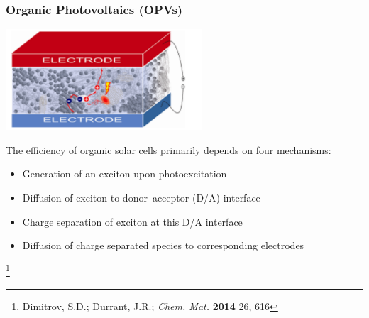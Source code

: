 \documentclass[usepdftitle=false,10pt]{beamer}
\newcommand\blfootnote[1]{%
  \begingroup
  \renewcommand\thefootnote{}\footnote{#1}%
  \addtocounter{footnote}{-1}%
  \endgroup
}
\begin{document}
%
\begin{frame}
  \frametitle{\textbf{O}rganic \textbf{P}hoto\textbf{v}oltaics (OPVs)}
  \begin{center}
    \includegraphics[width=0.55\textwidth]{OPV}
  \end{center}
  The efficiency of organic solar cells primarily depends on four
  mechanisms:
  \begin{itemize}
    \item[\ding{228}] Generation of an exciton upon photoexcitation
    \item[\ding{228}] Diffusion of exciton to donor--acceptor (D/A) interface
    \item[\ding{228}] Charge separation of exciton at this D/A interface
    \item[\ding{228}] Diffusion of charge separated species to corresponding electrodes
  \end{itemize}
  \blfootnote{\tiny Dimitrov, S.D.; Durrant, J.R.; \emph{Chem. Mat.} \textbf{2014} 26, 616}
\end{frame}
\end{document}
